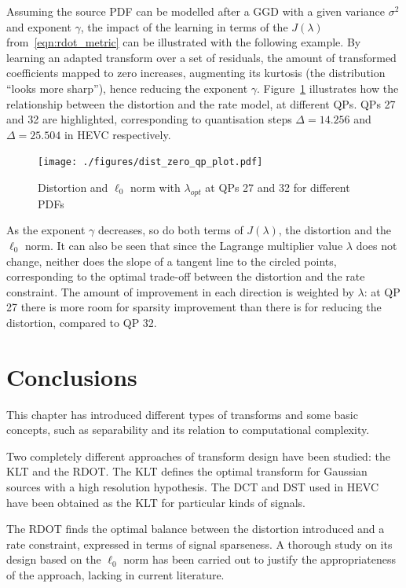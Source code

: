 \documentclass[11pt,a4paper,openright,twoside]{book}
\numberwithin{equation}{section} %
\numberwithin{figure}{section} %
\numberwithin{table}{section} %
\begin{document}
Assuming the source \ac{PDF} can be modelled after a \ac{GGD} with a
given variance $\sigma^2$ and exponent $\gamma$, the impact of the
learning in terms of the $J(\lambda)$ from~\eqref{eqn:rdot_metric} can
be illustrated with the following example.
By learning an adapted transform over a set of residuals, the amount of
transformed coefficients mapped to zero increases, augmenting its
kurtosis (the distribution ``looks more sharp''), hence reducing the
exponent $\gamma$.
Figure~\ref{fig:lambda_zero_norm_dist} illustrates how the relationship
between the distortion and the rate model, at different \acp{QP}.
\acp{QP} 27 and 32 are highlighted, corresponding to quantisation steps
$\Delta = 14.256$ and $\Delta = 25.504$ in \ac{HEVC} respectively.

\begin{figure}[tp]
	\centering
	\texttt{[image: ./figures/dist\_zero\_qp\_plot.pdf]}
	\caption{Distortion and $\ell_0$ norm with $\lambda_{opt}$ at
	\acsp{QP} 27 and 32 for different \acsp{PDF}}
	\label{fig:lambda_zero_norm_dist}
\end{figure}

As the exponent $\gamma$ decreases, so do both terms of $J(\lambda)$,
the distortion and the $\ell_0$ norm.
It can also be seen that since the Lagrange multiplier value $\lambda$
does not change, neither does the slope of a tangent line to the circled
points, corresponding to the optimal trade-off between the distortion
and the rate constraint.
The amount of improvement in each direction is weighted by $\lambda$: at
\ac{QP} 27 there is more room for sparsity improvement than there is for
reducing the distortion, compared to \ac{QP} 32.

\section{Conclusions}
\label{sec:conclusions_transforms}

This chapter has introduced different types of transforms and some
basic concepts, such as separability and its relation to computational
complexity.

Two completely different approaches of transform design have been
studied: the \ac{KLT} and the \ac{RDOT}.
The \ac{KLT} defines the optimal transform for Gaussian sources with a
high resolution hypothesis.
The \ac{DCT} and \ac{DST} used in \ac{HEVC} have been obtained as the
\ac{KLT} for particular kinds of signals.

The \ac{RDOT} finds the optimal balance between the distortion
introduced and a rate constraint, expressed in terms of signal sparseness.
A thorough study on its design based on the $\ell_0$ norm has been carried out
to justify the appropriateness of the approach, lacking in current literature.
\end{document}
